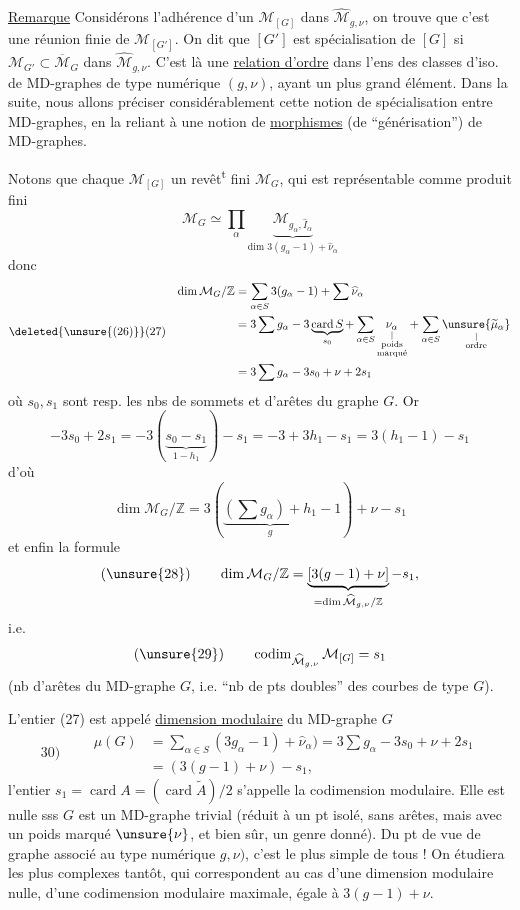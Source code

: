 \uline{Remarque} Considérons l'adhérence d'un $\mathcal M_{[G]}$ dans $\widehat{\mathcal M}_{g,\nu}$, on trouve que c'est une réunion finie de $\mathcal M_{[G']}$. On dit que $[G']$ est spécialisation de $[G]$ si $\mathcal M_{G'}\subset\overline{\mathcal M}_G$ dans $\widehat{\mathcal M}_{g,\nu}$.
C'est là une \uline{relation d'ordre} dans l'ens des classes d'iso. de MD-graphes de type numérique $(g,\nu)$, ayant un plus grand élément. Dans la suite, nous allons préciser considérablement cette notion de spécialisation entre MD-graphes, en la reliant à une notion de \uline{morphismes} (de ``générisation'') de MD-graphes.

Notons que chaque $\mathcal M_{[G]}$  un revêt\textsuperscript{t} fini $\mathcal M_G$, qui est représentable comme produit fini
\[
\mathcal M_G\simeq\prod_\alpha\underbrace{\mathcal M_{g_\alpha,\widehat I_\alpha}}_{\text{dim }3(g_\alpha-1)+\widehat\nu_\alpha}
\]
donc
\[
\deleted{\unsure{(26)}}(27)\quad\begin{aligned}
\dim\mathcal M_G/\mathbb Z&=\sum_{\alpha\in S}3(g_\alpha-1)+\sum\widehat\nu_\alpha\\
&=3\sum g_\alpha-3\underbrace{\operatorname{card}S}_{s_0}+\sum_{\alpha\in S}\underset{\substack{|\\\text{poids}\\\text{marqué}}}{\nu_\alpha}+\sum_{\alpha\in S}\underset{\substack{|\\\text{ordre}}}{\unsure{\widetilde\mu_\alpha}}\\
&=3\sum g_\alpha-3s_0+\nu+2s_1
\end{aligned}
\]
où $s_0,s_1$ sont resp. les nbs de sommets et d'arêtes du graphe $G$. Or
\[
-3s_0+2s_1=-3(\underbrace{s_0-s_1}_{1-h_1})-s_1=-3+3h_1-s_1=3(h_1-1)-s_1
\]
d'où
\[
\dim\mathcal M_G/\mathbb Z=3(\underbrace{(\sum g_\alpha)+h_1}_{g}-1)+\nu-s_1
\]
et enfin la formule
\[
(\unsure{28})\qquad\dim\mathcal M_G/\mathbb Z=\underbrace{[3(g-1)+\nu]}_{=\dim\widehat{\mathcal M}_{g,\nu}/\mathbb Z}-s_1,
\]
i.e.
\[
(\unsure{29})\qquad\operatorname{codim}_{\widehat{\mathcal M}_{g,\nu}}\mathcal M_{[G]}=s_1
\]
(nb d'arêtes du MD-graphe $G$, i.e. ``nb de pts doubles'' des courbes  de type $G$).

L'entier (27) est appelé \uline{dimension modulaire} du MD-graphe $G$
\[
30)\qquad\begin{aligned}
\mu(G)&=\sum_{\alpha\in S}(3g_\alpha-1)+\widehat\nu_\alpha)=3\sum g_\alpha-3s_0+\nu+2s_1\\
&=(3(g-1)+\nu)-s_1,
\end{aligned}
\]
l'entier $s_1=\operatorname{card}A=(\operatorname{card}\widetilde A)/2$ s'appelle la codimension modulaire. Elle est nulle sss $G$ est un MD-graphe trivial (réduit à un pt isolé, sans arêtes, mais
avec un poids marqué $\unsure{\nu}$, et bien sûr, un genre donné). Du pt de vue  de graphe associé au type numérique $g,\nu)$, c'est le plus simple de tous ! On étudiera les plus complexes tantôt, qui correspondent au cas d'une dimension modulaire nulle,  d'une codimension modulaire maximale, égale à $3(g-1)+\nu$.

